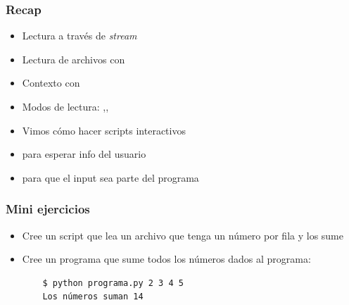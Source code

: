 \documentclass[14pt,aspectratio=169,xcolor=dvipsnames]{beamer}
\begin{document}
\begin{frame}\frametitle{Recap}
    \begin{itemize}
        \item Lectura a través de \emph{stream}
        \item Lectura de archivos con 
        \item Contexto con 
        \item Modos de lectura: ,,
        \item Vimos cómo hacer scripts interactivos
        \item {} para esperar info del usuario
        \item {} para que el input sea parte del programa
    \end{itemize}
\end{frame}
\begin{frame}
    \maketitle
\end{frame}
\begin{frame}[fragile]\frametitle{Mini ejercicios}
    \begin{itemize}
        \item Cree un script que lea un archivo que tenga un número por fila y los sume
        \item Cree un programa que sume todos los números dados al programa: 
        \begin{verbatim}
    $ python programa.py 2 3 4 5  
    Los números suman 14
        \end{verbatim}

    \end{itemize}
\end{frame}

\begin{frame}
    \maketitle
\end{frame}
\end{document}
